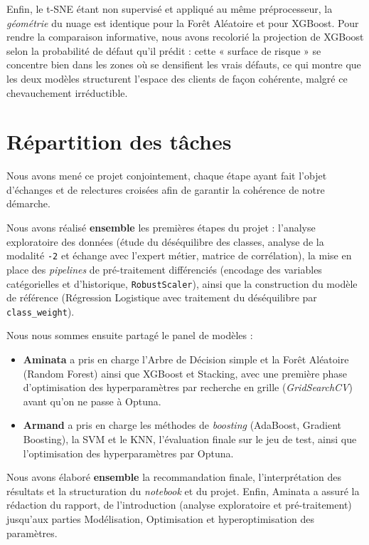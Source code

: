 \documentclass{article}
\begin{document}
Enfin, le t-SNE étant non supervisé et appliqué au même préprocesseur, la \emph{géométrie} du nuage est identique pour la Forêt Aléatoire et pour XGBoost. Pour rendre la comparaison informative, nous avons recolorié la projection de XGBoost selon la probabilité de défaut qu'il prédit : cette « surface de risque » se concentre bien dans les zones où se densifient les vrais défauts, ce qui montre que les deux modèles structurent l'espace des clients de façon cohérente, malgré ce chevauchement irréductible.

\section{Répartition des tâches}

Nous avons mené ce projet conjointement, chaque étape ayant fait l'objet d'échanges et de relectures croisées afin de garantir la cohérence de notre démarche.

Nous avons réalisé \textbf{ensemble} les premières étapes du projet : l'analyse exploratoire des données (étude du déséquilibre des classes, analyse de la modalité \texttt{-2} et échange avec l'expert métier, matrice de corrélation), la mise en place des \textit{pipelines} de pré-traitement différenciés (encodage des variables catégorielles et d'historique, \texttt{RobustScaler}), ainsi que la construction du modèle de référence (Régression Logistique avec traitement du déséquilibre par \texttt{class\_weight}).

Nous nous sommes ensuite partagé le panel de modèles :

\begin{itemize}
    \item \textbf{Aminata} a pris en charge l'Arbre de Décision simple et la Forêt Aléatoire (Random Forest) ainsi que XGBoost et Stacking, avec une première phase d'optimisation des hyperparamètres par recherche en grille (\textit{GridSearchCV}) avant qu'on ne passe à Optuna.
    \item \textbf{Armand} a pris en charge les méthodes de \textit{boosting} (AdaBoost, Gradient Boosting), la SVM et le KNN, l'évaluation finale sur le jeu de test, ainsi que l'optimisation des hyperparamètres par Optuna.
\end{itemize}

Nous avons élaboré \textbf{ensemble} la recommandation finale, l'interprétation des résultats et la structuration du \textit{notebook} et du projet. Enfin, Aminata a assuré la rédaction du rapport, de l'introduction (analyse exploratoire et pré-traitement) jusqu'aux parties Modélisation, Optimisation et hyperoptimisation des paramètres.
\end{document}
